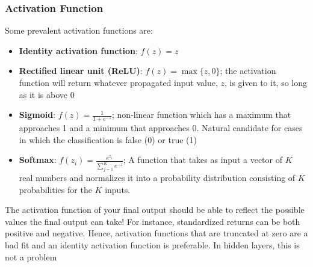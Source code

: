 \documentclass[xcolor=dvipsnames, english, 8pt]{beamer}
\begin{document}
\begin{frame}
\begin{center}
\end{center}
\end{frame}

\begin{frame}
    \frametitle{Activation Function}
    Some prevalent activation functions are:\vspace{0.25cm}\\
    \begin{itemize}
        \item \textbf{\color{ubRed}Identity activation function}: $f(z) = z$
        \item \textbf{\color{ubRed}Rectified linear unit (ReLU)}: $f(z) = \max\{z,0\}$; the activation function will return whatever propagated input value, $z$, is given to it, so long as it is above 0
        \item \textbf{\color{ubRed}Sigmoid}: $f(z) = \frac{1}{1+e^{-z}}$; non-linear function which has a maximum that approaches 1 and a minimum that approaches 0. Natural candidate for cases in which the classification is false (0) or true (1)
        \item \textbf{\color{ubRed}Softmax}: $f(z_i) = \frac{e^{z_i}}{\sum_{j=1}^{K}e^{-z}}$; A function that takes as input a vector of $K$ real numbers and normalizes it into a probability distribution consisting of $K$ probabilities for the $K$ inputs.
        \vspace{0.25cm}\\
    \end{itemize}
    The activation function of your final output should be able to reflect the possible values the final output can take! For instance, standardized returns can be both positive and negative. Hence, activation functions that are truncated at zero are a bad fit and an identity activation function is preferable. In hidden layers, this is not a problem
\end{frame}
\end{document}
